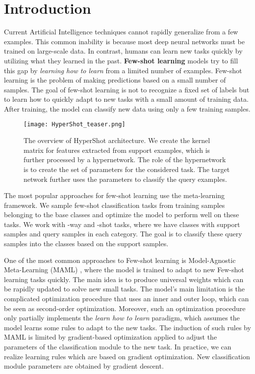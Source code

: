 \documentclass[nohyperref]{article}
\def\our{HyperShot}
\theoremstyle{plain}
\theoremstyle{definition}
\theoremstyle{remark}
\begin{document}
\section{Introduction}
\label{intro}


Current Artificial Intelligence techniques cannot rapidly generalize from a few examples. This common inability is because most deep neural networks must be trained on large-scale data. In contrast, humans can learn new tasks quickly by utilizing what they learned in the past. {\bf Few-shot learning} models try to fill this gap by \textit{learning how to learn} from a limited number of examples.
Few-shot learning is the problem of making predictions based on a small number of samples. The goal of few-shot learning is not to recognize a fixed set of labels but to learn how to quickly adapt to new tasks with a small amount of training data. After training, the model can classify new data using only a few training samples.



\begin{figure*}[t]
    \vskip 0.2in
    \begin{center}
    \centerline{\texttt{[image: HyperShot\_teaser.png]}}
    \caption{The overview of \our{} architecture. We create the kernel matrix for features extracted from support examples, which is further processed by a hypernetwork. The role of the hypernetwork is to create the set of parameters for the considered task. The target network further uses the parameters to classify the query examples. }
    \label{fig:teaser}
    \end{center}
    \vskip -0.3in
\end{figure*}

The most popular approaches for few-shot learning use the meta-learning framework. We sample few-shot classification tasks from training samples belonging to the base classes and optimize the model to perform well on these tasks.
We work with -way and -shot tasks, where we have  classes with  support samples and  query samples in each category.
The goal is to classify these  query samples into the  classes based on the  support samples.

One of the most common approaches to Few-shot learning is Model-Agnostic Meta-Learning (MAML) \cite{finn2017model}, where the model is trained to adapt to new Few-shot learning tasks quickly. The main idea is to produce universal weights which can be rapidly updated to solve new small tasks. The model's main limitation is the complicated optimization procedure that uses an inner and outer loop, which can be seen as second-order optimization.
Moreover, such an optimization procedure only partially implements the \emph{learn how to learn} paradigm, which assumes the model learns some rules to adapt to the new tasks. The induction of such rules by MAML is limited by gradient-based optimization applied to adjust the parameters of the classification module to the new task. In practice, we can realize learning rules which are based on gradient optimization. New classification module parameters are obtained by gradient descent. 
\end{document}
